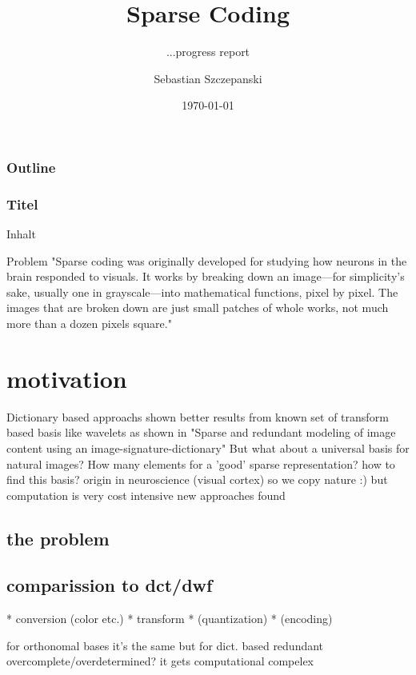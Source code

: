 




\title{Sparse Coding}
\subtitle{...progress report}
\author{Sebastian Szczepanski}
\date{\today}

\begin{frame}
\titlepage
\end{frame}

\begin{frame}
\frametitle{Outline}
\tableofcontents[part=1,pausesections]
\end{frame}

\begin{frame}
\frametitle{Titel}
Inhalt
\begin{block}{Problem}
"Sparse coding was originally developed for studying how neurons in the brain responded to visuals. It works by breaking down an image—for simplicity's sake, usually one in grayscale—into mathematical functions, pixel by pixel. The images that are broken down are just small patches of whole works, not much more than a dozen pixels square."
\end{block}
\end{frame}

\section{motivation}
\begin{frame}
Dictionary based approachs shown better results from known set of transform based basis like wavelets
as shown in "Sparse and redundant modeling of image content using an image-signature-dictionary"
But what about a universal basis for natural images? 
How many elements for a 'good' sparse representation?
how to find this basis?
origin in neuroscience (visual cortex) so we copy nature :)
but computation is very cost intensive
new approaches found 
\end{frame}
\subsection*{the problem}
\subsection{comparission to dct/dwf}
\begin{frame}
* conversion (color etc.)
* transform
* (quantization)
* (encoding)

for orthonomal bases it's the same but for dict. based redundant overcomplete/overdetermined?
it gets computational compelex

\end{frame}


